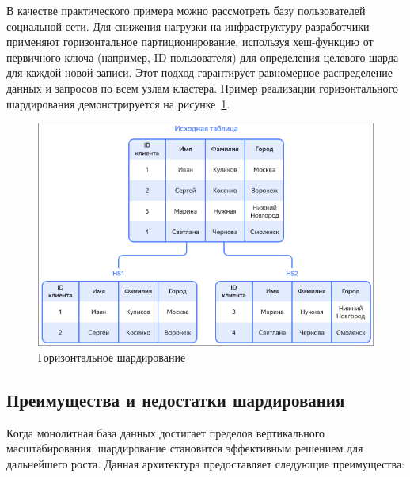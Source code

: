 \begin{itemize}
    В качестве практического примера можно рассмотреть базу пользователей
    социальной сети. Для снижения нагрузки на инфраструктуру разработчики
    применяют горизонтальное партиционирование, используя хеш-функцию от
    первичного ключа (например, ID пользователя) для определения целевого шарда
    для каждой новой записи. Этот подход гарантирует равномерное распределение
    данных и запросов по всем узлам кластера. Пример реализации горизонтального
    шардирования демонстрируется на рисунке~\ref{fig:fig02}.

\begin{figure}
  \centering
  \includegraphics[scale=0.35]{inc/horizontal-sharding.png}
  \caption{Горизонтальное шардирование}
  \label{fig:fig02}
\end{figure}
\end{itemize}

\subsection{Преимущества и недостатки шардирования}

Когда монолитная база данных достигает пределов вертикального масштабирования,
шардирование становится эффективным решением для дальнейшего роста. Данная
архитектура предоставляет следующие преимущества:

